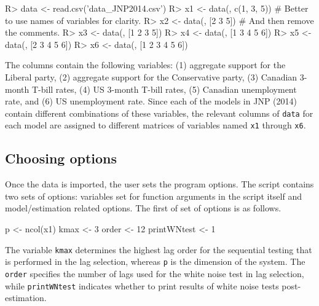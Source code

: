 \documentclass[article]{jss}
\begin{document}
\begin{Code}
R> data <- read.csv('data_JNP2014.csv')
R> x1 <- data(, c(1, 3, 5)) # Better to use names of variables for clarity. 
R> x2 <- data(, [2 3 5]) # And then remove the comments. 
R> x3 <- data(, [1 2 3 5])
R> x4 <- data(, [1 3 4 5 6])
R> x5 <- data(, [2 3 4 5 6])
R> x6 <- data(, [1 2 3 4 5 6])
\end{Code}

The columns contain the following variables: (1) aggregate support for the Liberal party, (2) aggregate support for the Conservative party, (3) Canadian 3-month T-bill rates, (4) US 3-month T-bill rates, (5) Canadian unemployment rate, and (6) US unemployment rate. Since each of the models in JNP (2014) contain different combinations of these variables, the relevant columns of \verb|data| for each model are assigned to different matrices of variables named \verb|x1| through \verb|x6|.

\subsection{Choosing options}
\label{subsec choosing options}

Once the data is imported, the user sets the program options. The script contains two sets of options: variables set for function arguments in the script itself and model/estimation related options. 
The first of set of options is as follows. 
% 
\begin{Code}
p               <- ncol(x1) 
kmax            <- 3
order           <- 12
printWNtest     <-  1
\end{Code}

The variable \verb|kmax| determines the highest lag order for the sequential testing that is performed in the lag selection, whereas \verb|p| is the dimension of the system. 
The \verb|order| specifies the number of lags used for the white noise test in lag selection, 
while \verb|printWNtest| indicates whether to print results of white noise tests post-estimation. 
\end{document}
